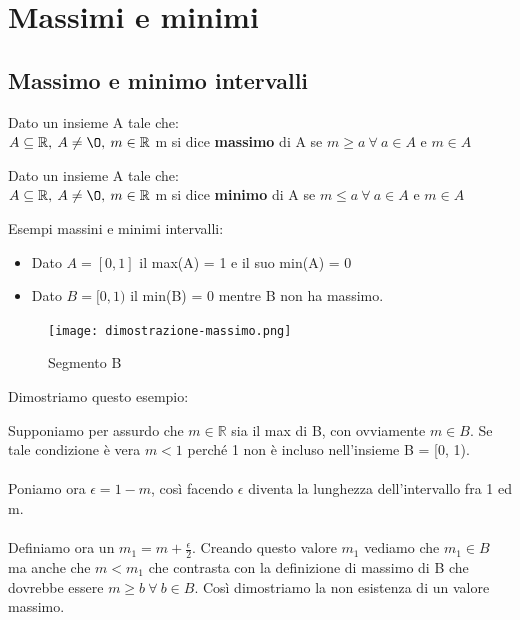 \section{Massimi e minimi}
\subsection{Massimo e minimo intervalli}
\begin{definition}[Massimo]
Dato un insieme A tale che: \\$A \subseteq \mathbb{R}, \: A \neq \O, \: m \in \mathbb{R}$ m si dice \textbf{massimo} di A se $m \geq a \: \forall \: a \in A$ e $m \in A$
\end{definition}
\begin{definition}[Minimo]
Dato un insieme A tale che: \\$A \subseteq \mathbb{R}, \: A \neq \O, \: m \in \mathbb{R}$ m si dice \textbf{minimo} di A se $m \leq a \: \forall \: a \in A$ e $m \in A$
\end{definition}
\begin{example}
    Esempi massini e minimi intervalli:
    \begin{itemize}
        \item Dato $A = [0,1]$ il max(A) = 1 e il suo min(A) = 0
        \item Dato $B = [0, 1)$ il min(B) = 0 mentre B non ha massimo.
    \end{itemize}
\end{example}

\begin{figure}
    \vspace{10pt}
    \centering
    \texttt{[image: dimostrazione-massimo.png]}
    \caption{Segmento B}
\end{figure}
\begin{demostration}
Dimostriamo questo esempio:
\end{demostration}
Supponiamo per assurdo che $m \in \mathbb{R}$ sia il max di B, con ovviamente $m \in B$. Se tale condizione è vera $m < 1$ perché 1 non è incluso nell'insieme B = [0, 1).\\ \\
Poniamo ora $\epsilon = 1 - m$, così facendo $\epsilon$ diventa la lunghezza dell'intervallo fra 1 ed m.\\ \\
Definiamo ora un $m_1 = m + \frac{\epsilon}{2}$. Creando questo valore $m_1$ vediamo che $m_1 \in B$ ma anche che $m < m_1$ che contrasta con la definizione di massimo di B che dovrebbe essere $m \geq b \: \forall \: b \in B$. Così dimostriamo la non esistenza di un valore massimo.

